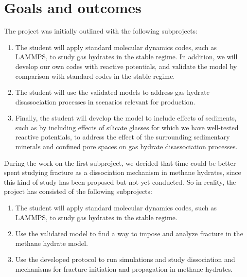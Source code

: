 \section{Goals and outcomes}
The project was initially outlined with the following subprojects:
\begin{enumerate}
\item {}
The student will apply standard molecular dynamics codes, such as LAMMPS,
to study gas hydrates in the stable regime. In addition, we will develop our
own codes with reactive potentials, and validate the model by comparison with
standard codes in the stable regime.
\item {}
The student will use the validated models to address gas hydrate disassociation
processes in scenarios relevant for production.
\item {}
Finally, the student will develop the model to include effects of sediments, such
as by including effects of silicate glasses for which we have well-tested reactive
potentials, to address the effect of the surrounding sedimentary minerals and
confined pore spaces on gas hydrate disassociation processes.
\end{enumerate}

During the work on the first subproject, we decided that time could be better spent studying fracture as a dissociation mechanism in methane hydrates, since this kind of study has been proposed but not yet conducted. So in reality, the project has consisted of the following subprojects:

\begin{enumerate}
\item {}
The student will apply standard molecular dynamics codes, such as LAMMPS,
to study gas hydrates in the stable regime.
\item {}
Use the validated model to find a way to impose and analyze fracture in the methane hydrate model. 
\item {}
Use the developed protocol to run simulations and study dissociation and mechanisms for fracture initiation and propagation in methane hydrates.
\end{enumerate}

